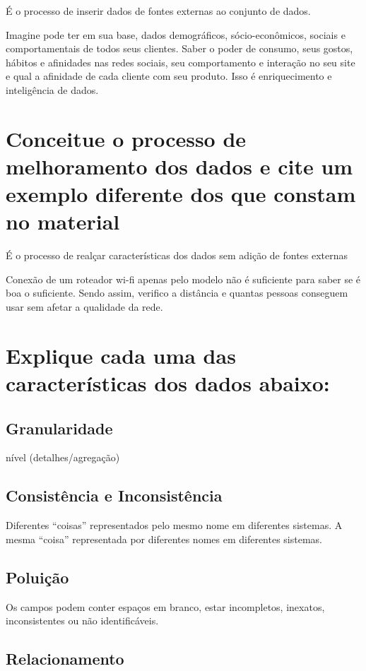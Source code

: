 É o processo de inserir dados de fontes externas ao conjunto de dados.

Imagine pode ter em sua base, dados demográficos, sócio-econômicos, sociais e comportamentais de todos seus clientes. Saber o poder de consumo, seus gostos, hábitos e afinidades nas redes sociais, seu comportamento e interação no seu site e qual a afinidade de cada cliente com seu produto. Isso é enriquecimento e inteligência de dados.
\cite{Livia}

\section{Conceitue o processo de melhoramento dos dados e cite um exemplo diferente dos que constam no material}

É o processo de realçar características dos dados sem adição de fontes externas

Conexão de um roteador wi-fi apenas pelo modelo não é suficiente para saber se é boa o suficiente. Sendo assim, verifico a distância e quantas pessoas conseguem usar sem afetar a qualidade da rede.
\cite{Livia}

\section{Explique cada uma das características dos dados abaixo:}
\subsection{Granularidade}

nível (detalhes/agregação)

\subsection{Consistência e Inconsistência}

Diferentes “coisas” representados pelo mesmo nome em diferentes sistemas. A mesma “coisa” representada por diferentes nomes em diferentes sistemas.

\subsection{Poluição}

Os campos podem conter espaços em branco, estar incompletos, inexatos, inconsistentes ou não identificáveis.

\subsection{Relacionamento}


